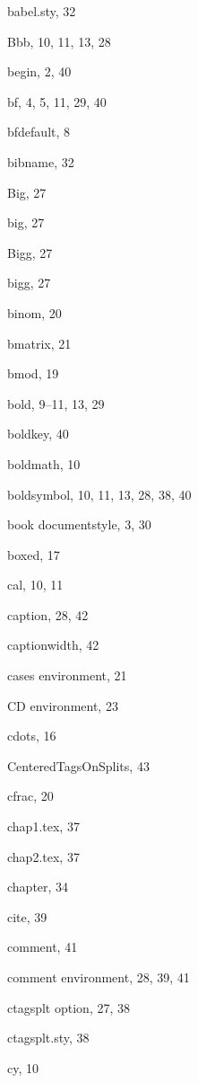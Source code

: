 \begin{theindex}
  \item {\ptt {}babel.sty}, 32
  \item {\ptt \bslash Bbb}, 10, 11, 13, 28
  \item {\ptt \bslash begin}, 2, 40
  \item {\ptt \bslash bf}, 4, 5, 11, 29, 40
  \item {\ptt \bslash bfdefault}, 8
  \item {\ptt \bslash bibname}, 32
  \item {\ptt \bslash Big}, 27
  \item {\ptt \bslash big}, 27
  \item {\ptt \bslash Bigg}, 27
  \item {\ptt \bslash bigg}, 27
  \item {\ptt \bslash binom}, 20
  \item {\ptt \bslash bmatrix}, 21
  \item {\ptt \bslash bmod}, 19
  \item {\ptt \bslash bold}, 9--11, 13, 29
  \item {\ptt \bslash boldkey}, 40
  \item {\ptt \bslash boldmath}, 10
  \item {\ptt \bslash boldsymbol}, 10, 11, 13, 28, 38, 40
  \item {\ptt {}book} documentstyle, 3, 30
  \item {\ptt \bslash boxed}, 17

  \indexspace

  \item {\ptt \bslash cal}, 10, 11
  \item {\ptt \bslash caption}, 28, 42
  \item {\ptt \bslash captionwidth}, 42
  \item {\ptt {}cases} environment, 21
  \item {\ptt {}CD} environment, 23
  \item {\ptt \bslash cdots}, 16
  \item {\ptt \bslash CenteredTagsOnSplits}, 43
  \item {\ptt \bslash cfrac}, 20
  \item {\ptt {}chap1.tex}, 37
  \item {\ptt {}chap2.tex}, 37
  \item {\ptt \bslash chapter}, 34
  \item {\ptt \bslash cite}, 39
  \item {\ptt \bslash comment}, 41
  \item {\ptt {}comment} environment, 28, 39, 41
  \item {\ptt {}ctagsplt} option, 27, 38
  \item {\ptt {}ctagsplt.sty}, 38
  \item {\ptt \bslash cy}, 10


\end{theindex}
